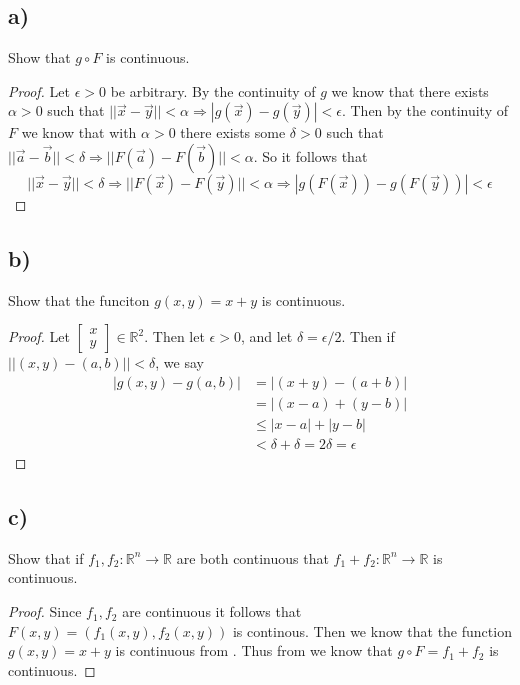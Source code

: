 \documentclass{article}
\theoremstyle{definition}
\begin{document}
\subsection*{a)}
\begin{mdframed}
    Show that $g \circ F$ is continuous.
\end{mdframed}
\begin{proof}
    Let $\epsilon > 0$ be arbitrary. By the continuity of $g$ we know that there exists $\alpha > 0$
    such that $||\vec x - \vec y||< \alpha \Longrightarrow |g(\vec x) - g(\vec y)| < \epsilon$.
    Then by the continuity of $F$ we know that with $\alpha > 0$ there exists some $\delta > 0$
    such that $||\vec a - \vec b|| < \delta \Longrightarrow ||F(\vec a) - F(\vec b)||< \alpha$.
    So it follows that
    \[
        ||\vec x - \vec y ||< \delta \Longrightarrow ||F(\vec x) - F(\vec y)|| < \alpha \Longrightarrow |g(F(\vec x)) - g(F(\vec y))| < \epsilon
    \]
\end{proof}
\subsection*{b)}
\begin{mdframed}
    Show that the funciton $g(x,y) = x + y$ is continuous.
\end{mdframed}
\begin{proof}
    Let $\begin{bmatrix}
        x\\y
    \end{bmatrix}\in \mathbb{R}^2$. Then let $\epsilon > 0$, and let $\delta = \epsilon / 2$.
    Then if $||( x, y ) - ( a, b ) || < \delta$, we say
    \begin{align*}
        |g(x,y) -g(a,b)| &= |(x+y) -(a+b)| \\
        &= |(x-a) + (y-b)|\\
        &\leqslant |x-a| + |y - b|\\
        &<\delta + \delta = 2\delta = \epsilon
    \end{align*}
\end{proof}
\subsection*{c)}
\begin{mdframed}
    Show that if $f_1,f_2 : \mathbb{R}^n \rightarrow \mathbb{R}$ are both continuous that $f_1 + f_2 : \mathbb{R}^n \rightarrow \mathbb{R}$ is continuous.
\end{mdframed}
\begin{proof}
    Since $f_1,f_2$ are continuous it follows that $F(x,y) = (f_1(x,y), f_2(x,y))$ is continous. Then
    we know that the function $g(x,y) = x + y$ is continuous from . Thus from  we know 
    that $g \circ F = f_1 + f_2$ is continuous.
\end{proof}
\end{document}
